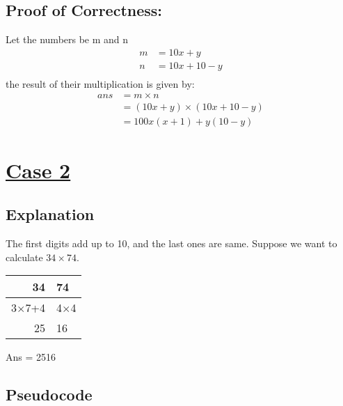 \documentclass[11pt, a4paper]{article}
\begin{document}
	\subsection{Proof of Correctness:\label{C1}\\}
	Let the numbers be m and n
	\begin{align*}
		m &= 10x+y\\%
		n &= 10x+10-y\\%
	\end{align*}
	the result of their multiplication is given by:\\
	\begin{align*}
		ans &= m \times n\\
				&= (10x+y) \times (10x +10-y)\\
				&= 100x(x+1) + y(10-y) 
	\end{align*}
	
	
	\newpage
	\section{\underline{Case 2}}
	\subsection{Explanation}
	The first digits add up to 10, and the last ones are same.
	Suppose we want to calculate $34 \times 74$.
	
	{\begin{center}
	\begin{tabular}{rl}
		34 & 74\\
		\hline
		 3$\times$7+4 & 4$\times$4\\
		 25 & 16\\
	\end{tabular}
	\end{center}}
	Ans = 2516
	
	\subsection{Pseudocode}\label{B2}
	\begin{algorithm}
		{}
	\end{algorithm}
	
\end{document}
